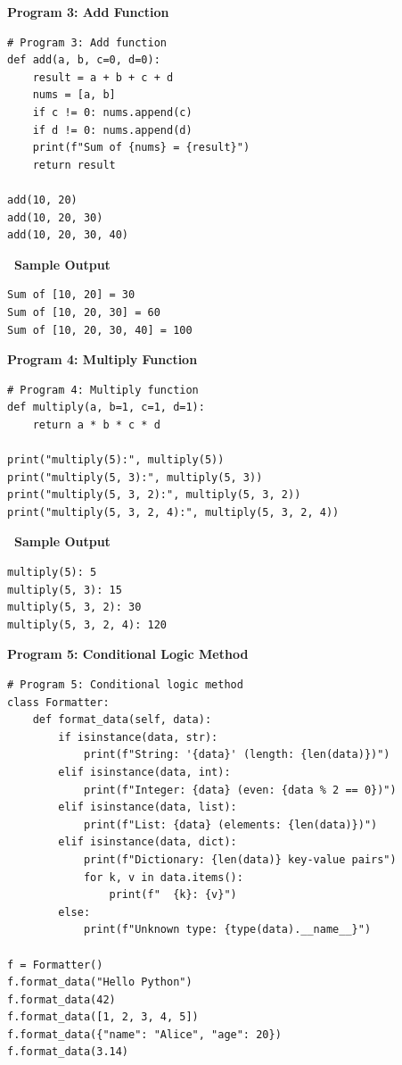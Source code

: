 \documentclass[12pt,a4paper]{article}
\newcommand{\outhead}{\noindent\colorbox{cmrgreen!25}%
  {\textbf{\small\color{cmrdark}~Sample Output~}}\par\vspace{-1pt}}
\begin{document}
\textbf{Program 3: Add Function}

\begin{lstlisting}
# Program 3: Add function
def add(a, b, c=0, d=0):
    result = a + b + c + d
    nums = [a, b]
    if c != 0: nums.append(c)
    if d != 0: nums.append(d)
    print(f"Sum of {nums} = {result}")
    return result

add(10, 20)
add(10, 20, 30)
add(10, 20, 30, 40)
\end{lstlisting}

\outhead
\begin{lstlisting}[style=outputstyle]
Sum of [10, 20] = 30
Sum of [10, 20, 30] = 60
Sum of [10, 20, 30, 40] = 100
\end{lstlisting}

\vspace{0.5cm}

\textbf{Program 4: Multiply Function}

\begin{lstlisting}
# Program 4: Multiply function
def multiply(a, b=1, c=1, d=1):
    return a * b * c * d

print("multiply(5):", multiply(5))
print("multiply(5, 3):", multiply(5, 3))
print("multiply(5, 3, 2):", multiply(5, 3, 2))
print("multiply(5, 3, 2, 4):", multiply(5, 3, 2, 4))
\end{lstlisting}

\outhead
\begin{lstlisting}[style=outputstyle]
multiply(5): 5
multiply(5, 3): 15
multiply(5, 3, 2): 30
multiply(5, 3, 2, 4): 120
\end{lstlisting}

\vspace{0.5cm}

\textbf{Program 5: Conditional Logic Method}

\begin{lstlisting}
# Program 5: Conditional logic method
class Formatter:
    def format_data(self, data):
        if isinstance(data, str):
            print(f"String: '{data}' (length: {len(data)})")
        elif isinstance(data, int):
            print(f"Integer: {data} (even: {data % 2 == 0})")
        elif isinstance(data, list):
            print(f"List: {data} (elements: {len(data)})")
        elif isinstance(data, dict):
            print(f"Dictionary: {len(data)} key-value pairs")
            for k, v in data.items():
                print(f"  {k}: {v}")
        else:
            print(f"Unknown type: {type(data).__name__}")

f = Formatter()
f.format_data("Hello Python")
f.format_data(42)
f.format_data([1, 2, 3, 4, 5])
f.format_data({"name": "Alice", "age": 20})
f.format_data(3.14)
\end{lstlisting}
\end{document}
